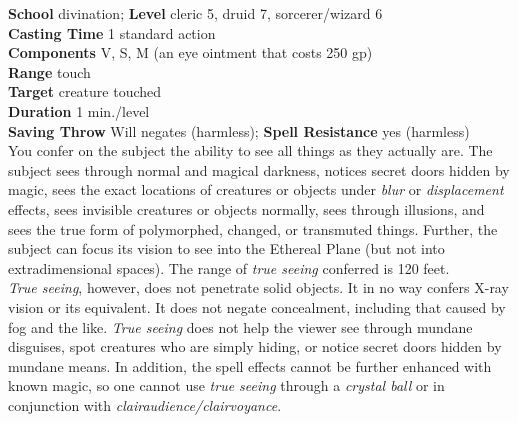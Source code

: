 \textbf{School} divination; \textbf{Level} cleric 5, druid 7, sorcerer/wizard 6\\
\textbf{Casting Time} 1 standard action\\
\textbf{Components} V, S, M (an eye ointment that costs 250 gp)\\
\textbf{Range} touch\\
\textbf{Target} creature touched\\
\textbf{Duration} 1 min./level\\
\textbf{Saving Throw }Will negates (harmless); \textbf{Spell Resistance} yes (harmless)\\
You confer on the subject the ability to see all things as they actually are. The subject sees through normal and magical darkness, notices secret doors hidden by magic, sees the exact locations of creatures or objects under \textit{blur }or \textit{displacement }effects, sees invisible creatures or objects normally, sees through illusions, and sees the true form of polymorphed, changed, or transmuted things. Further, the subject can focus its vision to see into the Ethereal Plane (but not into extradimensional spaces). The range of \textit{true seeing }conferred is 120 feet.\\
\textit{True seeing}, however, does not penetrate solid objects. It in no way confers X-ray vision or its equivalent. It does not negate concealment, including that caused by fog and the like. \textit{True seeing }does not help the viewer see through mundane disguises, spot creatures who are simply hiding, or notice secret doors hidden by mundane means. In addition, the spell effects cannot be further enhanced with known magic, so one cannot use \textit{true seeing }through a \textit{crystal ball }or in conjunction with \textit{clairaudience/clairvoyance}.\\
